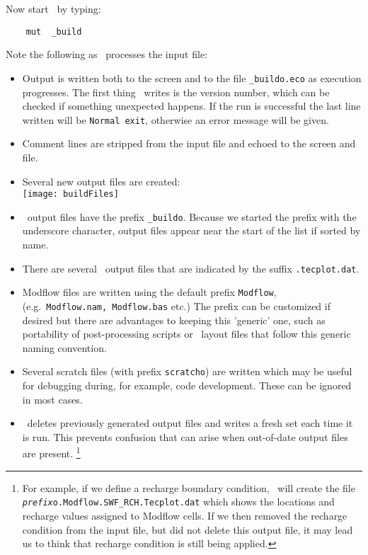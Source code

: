 Now start \mut\ by typing:
\begin{verbatim}
    mut  _build
\end{verbatim}
Note the following as \mut\ processes the input file:
\begin{itemize}
    \item Output is written both to the screen and to the file \verb+_buildo.eco+ as execution progresses.  The first thing \mut\ writes is the version number, which can be checked if something unexpected happens. If the run is successful the last line written will be \texttt{Normal exit}, otherwise an error message will be given.
    \item  Comment lines are stripped from the input file and echoed to the screen and file.
    \item  Several new output files are created:
        \vspace{.2in} \\
        \texttt{[image: buildFiles]}
        \vspace{.2in} \\
    \item \mut\ output files have the prefix \texttt{\_buildo}.  Because we started the prefix with the underscore character,  output files appear near the start of the list if sorted by name.
    \item There are several \tecplot\ output files that are indicated by the suffix \texttt{.tecplot.dat}.
    \item Modflow files are written using the default prefix \texttt{Modflow}, (e.g.\ \texttt{Modflow.nam, Modflow.bas} etc.)  The prefix can be customized if desired but there are advantages to keeping this 'generic' one, such as portability of post-processing scripts or \tecplot\ layout files that follow this generic naming convention.
    \item Several scratch files (with prefix \texttt{scratcho}) are written which may be useful for debugging during, for example, code development.  These can be ignored in most cases.
    \item \mut\ deletes previously generated output files and writes a fresh set each time it is run.  This prevents confusion that can arise when out-of-date output files are present.
        \footnote{For example, if we define a recharge boundary condition, \mut\ will create the file \texttt{\textit{prefix}o.Modflow.SWF\_RCH.Tecplot.dat} which shows the locations and recharge values assigned to Modflow cells.  If we then removed the recharge condition from the input file, but did not delete this output file, it may lead us to think that recharge condition is still being applied.}
\end{itemize}


